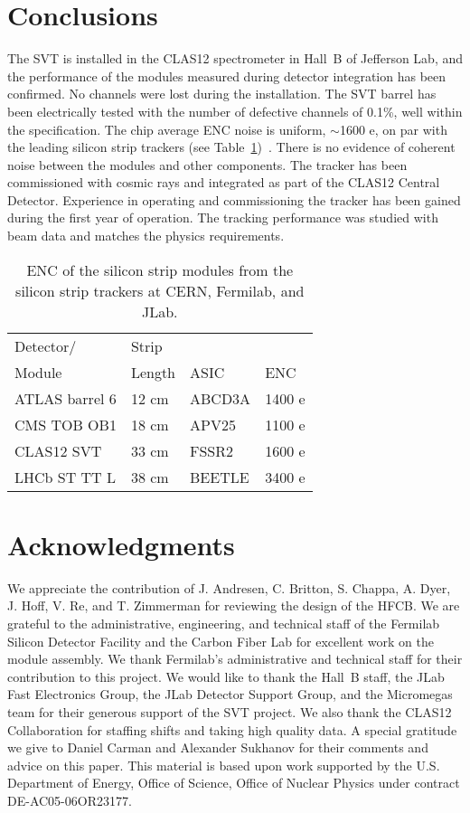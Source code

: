 \section{Conclusions}

The SVT is installed in the CLAS12 spectrometer in Hall~B of Jefferson Lab, and the performance of the modules
measured during detector integration has been confirmed. No channels were lost during the installation. The SVT
barrel has been electrically  tested with the number of defective channels of 0.1\%, well within the specification.
The chip average ENC noise is uniform, $\sim$1600 e, on par with the leading silicon strip trackers (see
Table~\ref{tab:enc-table})~\cite{CMSCOSMICNOTE, ATLASSCT, LHCBTT}. There is no evidence of coherent
noise between the modules and other components. The tracker has been commissioned with cosmic rays and
integrated as part of the CLAS12 Central Detector. Experience in operating and commissioning the tracker has
been gained during the first year of operation. The tracking performance was studied with beam data and matches
the physics requirements. 

\begin{table}[hbt]
\begin{tabular}{llll} \hline
  Detector/      & Strip &  & \\
  Module      & Length & ASIC & ENC\\ \hline
ATLAS barrel 6        & 12 cm & ABCD3A    & 1400 e\\
CMS TOB OB1        & 18  cm & APV25       & 1100 e\\
CLAS12 SVT           & 33 cm & FSSR2       & 1600 e\\
LHCb ST TT L         & 38 cm & BEETLE     & 3400 e\\ \hline
\end{tabular}
\caption{ENC of the silicon strip modules from the silicon strip trackers at CERN, Fermilab, and JLab.}
\label{tab:enc-table}
\end{table}

\section{Acknowledgments}

We appreciate the contribution of J.  Andresen, C. Britton, S. Chappa, A. Dyer, J. Hoff, V. Re, and T. Zimmerman
for reviewing the design of the HFCB. We are grateful to the administrative, engineering, and technical staff of
the Fermilab Silicon Detector Facility and the Carbon Fiber Lab for excellent work on the module assembly. We
thank Fermilab's administrative and technical staff for their contribution to this project. We would like to thank
the Hall~B staff, the JLab Fast Electronics Group, the JLab Detector Support Group, and the Micromegas team
for their generous support of the SVT project. We  also  thank the CLAS12 Collaboration for staffing shifts and
taking high quality data. A special gratitude we give to Daniel Carman and Alexander Sukhanov for their comments
and advice on this paper. This material is based upon work supported by the U.S. Department of Energy, Office of
Science, Office of Nuclear Physics under contract DE-AC05-06OR23177.


